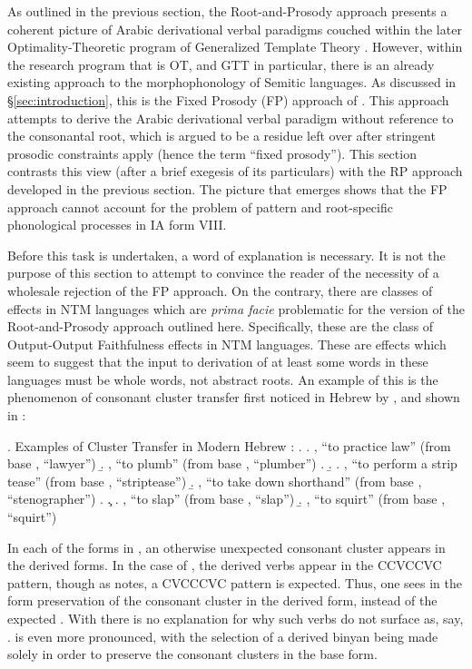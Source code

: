 \documentclass[12pt,twoside,letterpaper]{article}
\begin{document}
As outlined in the previous section, the Root-and-Prosody approach presents a coherent picture of Arabic derivational verbal paradigms couched within the later Optimality-Theoretic program of Generalized Template Theory \citep{mccarthy97}. However, within the research program that is OT, and GTT in particular, there is an already existing approach to the morphophonology of Semitic languages. As discussed in \S{\ref{sec:introduction}}, this is the Fixed Prosody (FP) approach of \cite{ussishkin00,buckley03,ussishkin05}. This approach attempts to derive the Arabic derivational verbal paradigm without reference to the consonantal root, which is argued to be a residue left over after stringent prosodic constraints apply (hence the term ``fixed prosody''). This section contrasts this view (after a brief exegesis of its particulars) with the RP approach developed in the previous section. The picture that emerges shows that the FP approach cannot account for the problem of pattern and root-specific phonological processes in IA form VIII.

Before this task is undertaken, a word of explanation is necessary. It is not the purpose of this section to attempt to convince the reader of the necessity of a wholesale rejection of the FP approach. On the contrary, there are classes of effects in NTM languages which are \emph{prima facie} problematic for the version of the Root-and-Prosody approach outlined here. Specifically, these are the class of Output-Output Faithfulness effects in NTM languages. These are effects which seem to suggest that the input to derivation of at least some words in these languages must be whole words, not abstract roots. An example of this is the phenomenon of consonant cluster transfer first noticed in Hebrew by \cite{batel94}, and shown in \Next:

\ex. \label{ex:cluster-transfer}Examples of Cluster Transfer in Modern Hebrew \citep[pp.578--9]{batel94}:
\a.
\a. , ``to practice law'' (from base {\em {}}, ``lawyer'')
\b. , ``to plumb'' (from base {\em {}}, ``plumber'')
\z.
\b.
\a. , ``to perform a strip tease'' (from base {\em {}}, ``striptease'')
\b. , ``to take down shorthand'' (from base {\em {}}, ``stenographer'')
\z.
\c. 
\a. , ``to slap'' (from base {\em {}}, ``slap'')
\b. , ``to squirt'' (from base {\em {}}, ``squirt'')

In each of the forms in \Last, an otherwise unexpected consonant cluster appears in the derived forms. In the case of \Last[a], the derived verbs appear in the CCVCCVC pattern, though as \cite{batel94} notes, a CVCCCVC pattern is expected. Thus, one sees in the form {\em {}} preservation of the consonant cluster {\em {}} in the derived form, instead of the expected {\em *}. With \Last[b] there is no explanation for why such verbs do not surface as, say, {\em *}. \Last[c] is even more pronounced, with the selection of a derived binyan being made solely in order to preserve the consonant clusters in the base form.
\end{document}
